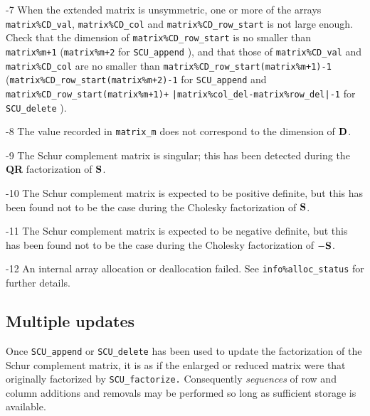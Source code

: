 \documentclass{galahad}
\newcommand{\packagename}{SCU}
\begin{document}
\begin{description}
\item{-7} When the extended matrix is unsymmetric, one or more of the arrays  
{\tt matrix\%CD\_val}, {\tt matrix\%CD\_col} and 
{\tt matrix\%CD\_row\_start} is not large enough. Check that the dimension 
of {\tt matrix\%CD\_row\_start} is no smaller than {\tt matrix\%m+1} 
({\tt matrix\%m+2} for {\tt \packagename\_append} ), and that those of  
{\tt matrix\%CD\_val} and {\tt matrix\%CD\_col} are no smaller than 
{\tt matrix\%CD\_row\_start(matrix\%m+1)-1} 
({\tt matrix\%CD\_row\_start(matrix\%m+2)-1} for {\tt \packagename\_app\-end} 
and {\tt matrix\%CD\_row\_start(matrix\%m+1)+} 
{\tt |matrix\%col\_del-matrix\%row\_del|-1} for {\tt \packagename\_delete} ). 

\item{-8} The value recorded in {\tt matrix\_m} does not correspond to the 
dimension of ${\mathbf{D}}$.  

\item{-9} The Schur complement matrix is singular; this has been 
detected during the {\bf QR } factorization of ${\mathbf{S}}$. 

\item{-10} The Schur complement matrix is expected to be positive definite, 
but this has been found not to be the case  
during the Cholesky factorization of ${\mathbf{S}}$. 

\item{-11} The Schur complement matrix is expected to be negative definite, 
but this has been found not to be the case  
during the Cholesky factorization of $-  {\mathbf{S}}$. 

\item{-12} An internal array allocation or deallocation failed.  
See {\tt info\%alloc\_status} for further details. 
 
\end{description}


\subsection{Multiple updates}
Once {\tt \packagename\_append} or {\tt \packagename\_delete} 
has been used to update the factorization of 
the Schur complement matrix, it is as if the enlarged or 
reduced matrix were 
that originally factorized by {\tt \packagename\_factorize.} 
Consequently {\em sequences} of row and column additions and removals 
may be performed so long as sufficient storage is 
available. 
\end{document}
